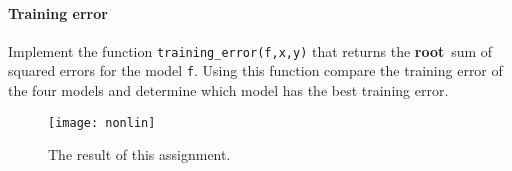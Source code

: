 \documentclass[a4paper,10pt]{article}
\begin{document}
\paragraph{Training error} Implement the function
\lstinline{training_error(f,x,y)} that returns the \color{red}
{\bf root}\color{black}\ sum of squared
  errors for the model \lstinline{f}. Using this function compare the
  training error of the four models and determine which model has the
  best training error.



\begin{figure}[tb]
\centering
\texttt{[image: nonlin]}
\caption{The result of this assignment.}
\end{figure}
\end{document}
